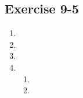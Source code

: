 \subsection{Exercise 9-5} %
\begin{enumerate} [itemsep=6pt, label=\textbf{\arabic*}.]

\item %

\item %

\item %
\item %
 \begin{enumerate}[noitemsep, label=\textbf{(\alph*)} ]
\item %


\item %

   
\end{enumerate}

\end{enumerate}

